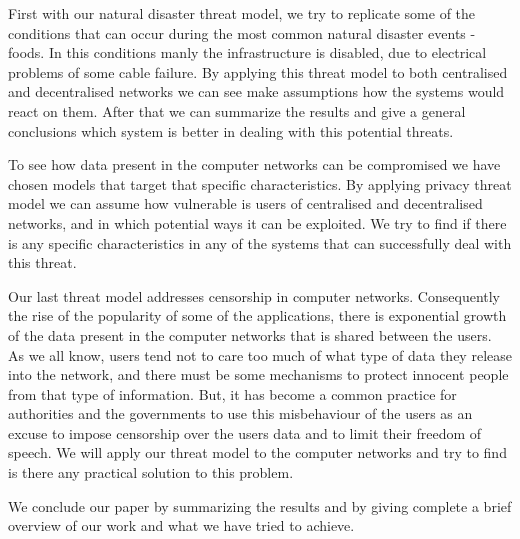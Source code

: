 First with our natural disaster threat model, we try to replicate some of the conditions that can occur during the most common natural disaster events -  foods. In this conditions manly the infrastructure is disabled, due to electrical problems of some cable failure. By applying this threat model to both centralised and decentralised networks we can see make assumptions how the systems would react on them. After that we can summarize the results and give a general conclusions which system is better in dealing with this potential threats.

To see how data present in the computer networks can be compromised we have chosen models that target that specific characteristics. By applying privacy threat model we can assume how vulnerable is  users of centralised and decentralised networks, and in which potential ways it can be exploited. We try to find if there is any specific characteristics in any of the systems that can successfully deal with this threat.

Our last threat model addresses censorship in computer networks. Consequently the rise of the popularity of some of the applications, there is exponential growth of the data present in the computer networks that is shared between the users. As we all know, users tend not to care too much of what type of data they release into the network, and there must be some mechanisms to protect innocent people from that type of information. But, it has become a common practice for authorities and the governments to use this misbehaviour of the users as an excuse to 	impose censorship over the users data and to limit their freedom of speech. We will apply our threat model to the computer networks and try to find is there any practical solution to this problem. 

We conclude our paper by summarizing the results and by giving complete a brief overview of our work and what we have tried to achieve.
